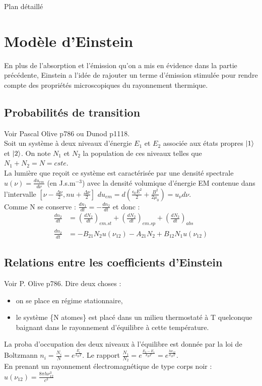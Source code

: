 \begin{reportBlock}{Plan détaillé}
\section{Modèle d'Einstein}
En plus de l'absorption et l'émission qu'on a mis en évidence dans la partie précédente, Einstein a l'idée de rajouter un terme d'émission stimulée pour rendre compte des propriétés microscopiques du rayonnement thermique. 
\subsection{Probabilités de transition}
Voir Pascal Olive p786 ou Dunod p1118.\\
Soit un système à deux niveaux d'énergie $E_1$ et $E_2$ associée aux états propres $\ket{1}$ et $\ket{2}$. On note $N_1$ et $N_2$ la population de ces niveaux telles que $N_1+N_2=N=cste$.\\

La lumière que reçoit ce système est caractérisée par une densité spectrale $u(\nu)=\frac{du_{em}}{d\nu}$ (en J.s.m$^{-3}$) avec la densité volumique d'énergie EM contenue dans l'intervalle $[\nu-\frac{\Delta\nu}{2},nu+\frac{\Delta\nu}{2}]$ $du_{em}=d\left(\frac{\epsilon_0E^2}{2}+\frac{B^2}{2\mu_0}\right)=u_{\nu}d\nu$.\\

Comme N se conserve : $\frac{dn_1}{dt}=-\frac{dn_2}{dt}$ et donc : 
\begin{align}
    \frac{dn_2}{dt} &= \left(\frac{dN_2}{dt}\right)_{em.st}+\left(\frac{dN_2}{dt}\right)_{em.sp} + \left(\frac{dN_2}{dt}\right)_{abs} \\
    \frac{dn_2}{dt} &= -B_{21}N_2u(\nu_{12})-A_{21}N_2 + B_{12}N_1u(\nu_{12})
\end{align}
\subsection{Relations entre les coefficients d'Einstein}

Voir P. Olive p786. Dire deux choses :
\begin{itemize}
    \item on se place en régime stationnaire,
    \item le système \{N atomes\} est placé dans un milieu thermostaté à T quelconque baignant dans le rayonnement d'équilibre à cette température.
\end{itemize}
La proba d'occupation des deux niveaux à l'équilibre est donnée par la loi de Boltzmann $n_i=\frac{N_i}{N}=e^{\frac{E_i}{k_BT}}$. Le rapport $\frac{N_1}{N_2}=e^{\frac{E_2-E_1}{k_BT}}=e^{\frac{h\nu_{12}}{k_BT}}$.\\
En prenant un rayonnement électromagnétique de type corps noir : $u(\nu_{12})=\frac{8\pi h\nu_{12}^3}{c^3}$


\end{reportBlock}
